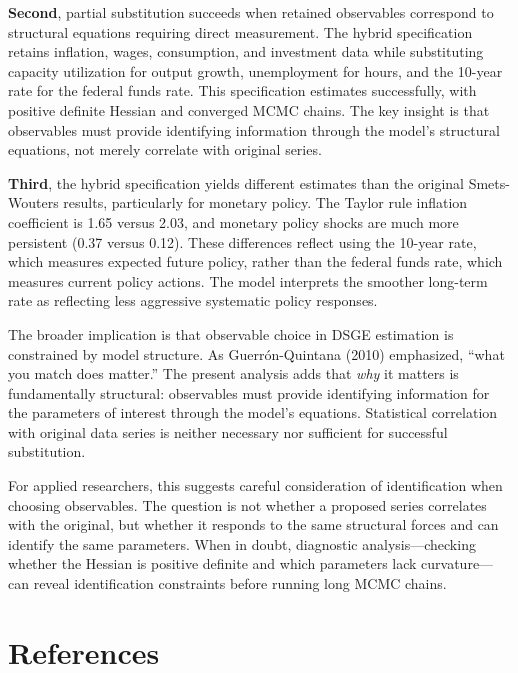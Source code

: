 \documentclass[12pt]{article}
\begin{document}
\textbf{Second}, partial substitution succeeds when retained observables correspond to structural equations requiring direct measurement. The hybrid specification retains inflation, wages, consumption, and investment data while substituting capacity utilization for output growth, unemployment for hours, and the 10-year rate for the federal funds rate. This specification estimates successfully, with positive definite Hessian and converged MCMC chains. The key insight is that observables must provide identifying information through the model's structural equations, not merely correlate with original series.

\textbf{Third}, the hybrid specification yields different estimates than the original Smets-Wouters results, particularly for monetary policy. The Taylor rule inflation coefficient is 1.65 versus 2.03, and monetary policy shocks are much more persistent (0.37 versus 0.12). These differences reflect using the 10-year rate, which measures expected future policy, rather than the federal funds rate, which measures current policy actions. The model interprets the smoother long-term rate as reflecting less aggressive systematic policy responses.

The broader implication is that observable choice in DSGE estimation is constrained by model structure. As Guerr\'{o}n-Quintana (2010) emphasized, ``what you match does matter.'' The present analysis adds that \textit{why} it matters is fundamentally structural: observables must provide identifying information for the parameters of interest through the model's equations. Statistical correlation with original data series is neither necessary nor sufficient for successful substitution.

For applied researchers, this suggests careful consideration of identification when choosing observables. The question is not whether a proposed series correlates with the original, but whether it responds to the same structural forces and can identify the same parameters. When in doubt, diagnostic analysis---checking whether the Hessian is positive definite and which parameters lack curvature---can reveal identification constraints before running long MCMC chains.

\newpage
\section*{References}
\end{document}
